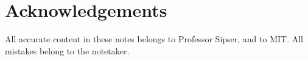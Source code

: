 \section*{Acknowledgements}

All accurate content in these notes belongs to Professor Sipser, and to MIT. 
All mistakes belong to the notetaker.


